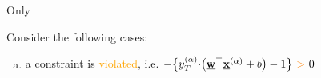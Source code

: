 \begin{frame}{Only}
{\begin{block}{}
\begin{enumerate}
\end{enumerate}

\end{block}%
}

{
Consider the following cases:

\begin{enumerate}[(a)]
	\item<only@2> a constraint is \textcolor{orange}{violated},\slidesonly{\\} i.e.
	\begingroup 
	\footnotesize
	$
	-\big\{ y_{T}^{(\alpha)} \kern-.5ex \cdot \kern-.5ex \big( \vec w^{\top} \vec x^{(\alpha)} + b \big) -1 \big\}~{\color{orange}>}~0
	$
	\endgroup 
	
\end{enumerate}}
\end{frame}
